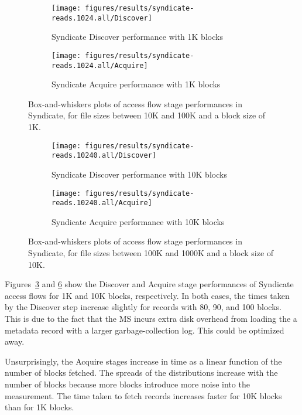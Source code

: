 \begin{figure}[htp!]
   \centering
   \begin{subfigure}[b]{.8\textwidth}
      \texttt{[image: figures/results/syndicate-reads.1024.all/Discover]}
      \label{fig:syndicate-read-discover-1k}
      \caption{Syndicate Discover performance with 1K blocks}
   \end{subfigure}
   \begin{subfigure}[b]{.8\textwidth}
      \texttt{[image: figures/results/syndicate-reads.1024.all/Acquire]}
      \label{fig:syndicate-read-acquire-1k}
      \caption{Syndicate Acquire performance with 1K blocks}
   \end{subfigure}
   \caption{Box-and-whiskers plots of access flow stage performances in
   Syndicate, for file sizes between 10K and 100K and a block size of 1K.}
   \label{fig:syndicate-read-stages-1K}
\end{figure}

\begin{figure}[htp!]
   \centering
   \begin{subfigure}[b]{.8\textwidth}
      \texttt{[image: figures/results/syndicate-reads.10240.all/Discover]}
      \label{fig:syndicate-read-discover-10k}
      \caption{Syndicate Discover performance with 10K blocks}
   \end{subfigure}
   \begin{subfigure}[b]{.8\textwidth}
      \texttt{[image: figures/results/syndicate-reads.10240.all/Acquire]}
      \label{fig:syndicate-read-acquire-1k}
      \caption{Syndicate Acquire performance with 10K blocks}
   \end{subfigure}
   \caption{Box-and-whiskers plots of access flow stage performances in
   Syndicate, for file sizes between 100K and 1000K and a block size of 10K.}
   \label{fig:syndicate-read-stages-10K}
\end{figure}


Figures~\ref{fig:syndicate-read-stages-1K} and \ref{fig:syndicate-read-stages-10K}
show the Discover and Acquire stage performances of Syndicate access flows for 1K and
10K blocks, respectively.
In both cases, the times taken by the Discover step increase slightly for
records with 80, 90, and 100 blocks.  This is due to the fact that the MS
incurs extra disk overhead from loading the a metadata record with a larger
garbage-collection log.  This could be optimized away.

Unsurprisingly, the Acquire stages increase in time as a linear function of the
number of blocks fetched.  The spreads of the distributions increase
with the number of blocks because more blocks introduce more noise into the
measurement.  The time taken to fetch records increases faster for 10K blocks
than for 1K blocks.


